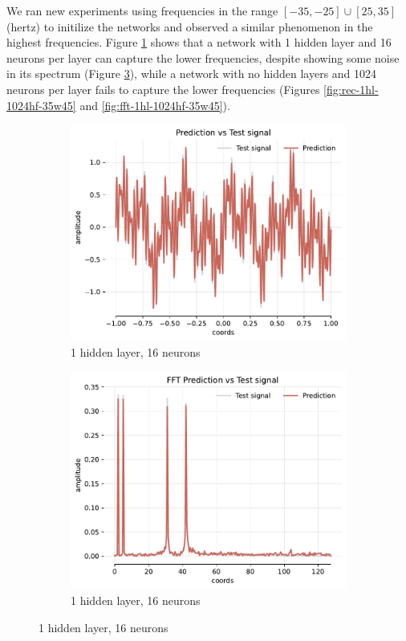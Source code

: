 We ran new experiments using frequencies in the range $[-35, -25] \cup [25, 35]$ (hertz) to initilize the networks and observed a similar phenomenon in the highest frequencies. Figure \ref{fig:rec-1hl-16hf-35w45} shows that a network with 1 hidden layer and 16 neurons per layer can capture the lower frequencies, despite showing some noise in its spectrum (Figure \ref{fig:fft-1hl-16hf-35w45}), while a network with no hidden layers and 1024 neurons per layer fails to capture the lower frequencies (Figures \ref{fig:rec-1hl-1024hf-35w45} and \ref{fig:fft-1hl-1024hf-35w45}).

\begin{figure}[h!]
    \centering
    \begin{subfigure}[b]{0.40\textwidth}
        \centering
        \includegraphics[width=\textwidth]{img/ch3/prediction_1hl_16hf_35w45.pdf}
        \caption{1 hidden layer, 16 neurons}
        \label{fig:rec-1hl-16hf-35w45}
    \end{subfigure}
    \begin{subfigure}[b]{0.40\textwidth}
        \centering
        \includegraphics[width=\textwidth]{img/ch3/fft_1hl_16hf_35w45.pdf}
        \caption{1 hidden layer, 16 neurons}
        \label{fig:fft-1hl-16hf-35w45}
    \end{subfigure}
    

\end{figure}
